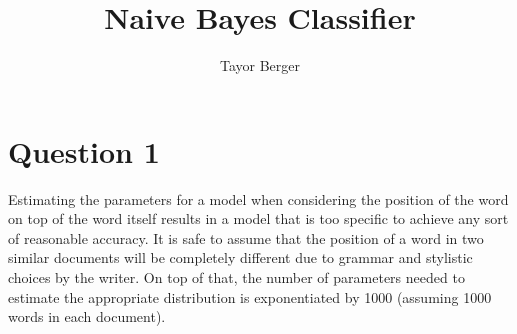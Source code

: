 \documentclass{article}
\begin{document}
\title{Naive Bayes Classifier}
\author{Tayor Berger}
\maketitle
\newpage

\section*{Question 1}
Estimating the parameters for a model when considering the position of the word on top of the word itself results in a model that is too specific to achieve any sort of reasonable accuracy. It is safe to assume that the position of a word in two similar documents will be completely different due to grammar and stylistic choices by the writer. On top of that, the number of parameters needed to estimate the appropriate distribution is exponentiated by 1000 (assuming 1000 words in each document). 
\end{document}
